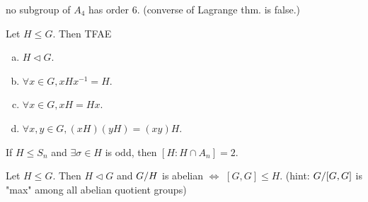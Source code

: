 
\begin{exercise}
  no subgroup of $A_4$ has order $6$.
  (converse of Lagrange thm. is false.)
\end{exercise}

\begin{exercise}
  Let $H \le G$. Then TFAE
  \begin{enumerate}[(a)]
    \item $H \lhd G$.
    \item $\forall x \in G, xHx^{-1} = H$.
    \item $\forall x \in G, xH = Hx$. \label{eq:xh=hx}
    \item $\forall x, y \in G, (xH)(yH) = (xy)H$.
  \end{enumerate}
\end{exercise}

\begin{exercise}
  If $H \le S_n$ and $\exists \sigma \in H$ is odd, then $[H:H\cap A_n] = 2$.
\end{exercise}

\begin{exercise}
  Let $H \le G$. Then  $H \lhd G$ and ${G}/{H}$ is abelian $\iff$
  $[G,G] \le H$.
  (hint: ${G}/{[G,G]}$ is "max" among all abelian quotient groups)
\end{exercise}

